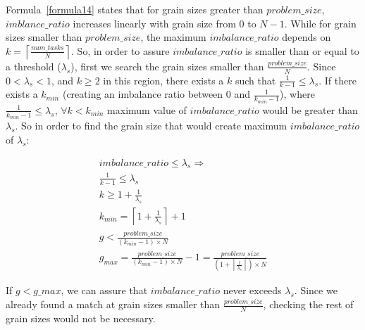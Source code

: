 Formula~\ref{formula14} states that for grain sizes greater than $problem\_{size}$, $imblance\_{ratio}$ increases linearly with grain size from $0$ to $N-1$. While for grain sizes smaller than $problem\_{size}$, the maximum $imbalance\_{ratio}$ depends on $k=\left\lceil{\frac{num\_{tasks}}{N}}\right\rceil$. So, in order to assure $imbalance\_{ratio}$ is smaller than or equal to a threshold ($\lambda_s$), first we search the grain sizes smaller than $\frac{problem\_{size}}{N}$. Since $0<\lambda_s<1$, and $k\geq2$ in this region, there exists a $k$ such that $\frac{1}{k-1}\leq\lambda_s$.    
If there exists a $k_{min}$ (creating an imbalance ratio between $0$ and $\frac{1}{k_{min}-1}$), where $\frac{1}{k_{min}-1}\leq{\lambda_s}$, $\forall k<k_{min}$ maximum value of $imbalance\_{ratio}$ would be greater than $\lambda_s$. So in order to find the grain size that would create maximum $imbalance\_{ratio}$ of $\lambda_s$:



\begin{equation}\label{formula21}
\begin{aligned}
imbalance\_{ratio}\leq{{\lambda_s}}\Rightarrow\\
\frac{1}{k-1}\leq\lambda_s\\
k\geq{1+\frac{1}{\lambda_s}}\\
k_{min}=\left\lceil{1+\frac{1}{\lambda_s}}\right\rceil+1\\
{g}<\frac{problem\_{size}}{(k_{min}-1)\times{N}}\\
g_{max}=\frac{problem\_{size}}{(k_{min}-1)\times{N}}-1=\frac{problem\_{size}}{(1+\left\lceil{\frac{1}{\lambda_s}}\right\rceil)\times{N}}
\end{aligned}
\end{equation}

If $g<g\_{max}$, we can assure that $imbalance\_{ratio}$ never exceeds $\lambda_s$. Since we already found a match at grain sizes smaller than $\frac{problem\_{size}}{N}$, checking the rest of grain sizes would not be necessary.





